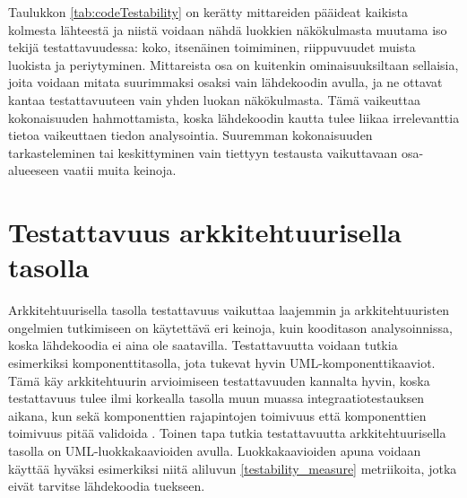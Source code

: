\documentclass[finnish]{tktltiki2}
\numberwithin{table}{section}
\theoremstyle{definition}
\theoremstyle{remark}
\begin{document}
\begin{table}[ht]
\centering
	\setlength{\extrarowheight}{4pt}%
\end{table}



\noindent
Taulukkon \ref{tab:codeTestability} on kerätty mittareiden pääideat kaikista kolmesta lähteestä ja niistä voidaan nähdä luokkien näkökulmasta muutama iso tekijä testattavuudessa: koko, itsenäinen toimiminen, riippuvuudet muista luokista ja periytyminen. Mittareista osa on kuitenkin ominaisuuksiltaan sellaisia, joita voidaan mitata suurimmaksi osaksi vain lähdekoodin avulla, ja ne ottavat kantaa testattavuuteen vain yhden luokan näkökulmasta. Tämä vaikeuttaa kokonaisuuden hahmottamista, koska lähdekoodin kautta tulee liikaa irrelevanttia tietoa vaikeuttaen tiedon analysointia. Suuremman kokonaisuuden tarkasteleminen tai keskittyminen vain tiettyyn testausta vaikuttavaan osa-alueeseen vaatii muita keinoja.

\section{Testattavuus arkkitehtuurisella tasolla} \label{arch_testability_main}

Arkkitehtuurisella tasolla testattavuus vaikuttaa laajemmin ja arkkitehtuuristen ongelmien tutkimiseen on käytettävä eri keinoja, kuin kooditason analysoinnissa, koska lähdekoodia ei aina ole saatavilla. Testattavuutta voidaan tutkia esimerkiksi komponenttitasolla, jota tukevat hyvin UML-komponenttikaaviot. Tämä käy arkkitehtuurin arvioimiseen testattavuuden kannalta hyvin, koska testattavuus tulee ilmi korkealla tasolla muun muassa integraatiotestauksen aikana, kun sekä komponenttien rajapintojen toimivuus että komponenttien toimivuus pitää validoida \citep[s. 65]{Eickelmann:1996:MOS:243327.243602}. Toinen tapa tutkia testattavuutta arkkitehtuurisella tasolla on UML-luokkakaavioiden avulla. Luokkakaavioiden apuna voidaan käyttää hyväksi esimerkiksi niitä aliluvun \ref{testability_measure} metriikoita, jotka eivät tarvitse lähdekoodia tuekseen. 
\end{document}
